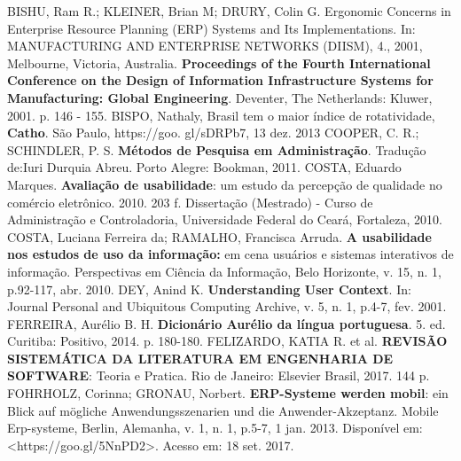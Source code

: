 \newline
\noindent 
BISHU, Ram R.; KLEINER, Brian M; DRURY, Colin G. Ergonomic Concerns in Enterprise Resource Planning (ERP) Systems and Its Implementations. In: MANUFACTURING AND ENTERPRISE NETWORKS (DIISM), 4., 2001, Melbourne, Victoria, Australia. \textbf{Proceedings of the Fourth International Conference on the Design of Information Infrastructure Systems for Manufacturing: Global Engineering}. Deventer, The Netherlands: Kluwer, 2001. p. 146 - 155.
\newline
\newline
\noindent
BISPO, Nathaly, Brasil tem o maior índice de rotatividade, \textbf{Catho}. São Paulo, https://goo. gl/sDRPb7, 13 dez. 2013
\newline
\newline
\noindent
COOPER, C. R.; SCHINDLER, P. S. \textbf{Métodos de Pesquisa em Administração}. Tradução de:Iuri Durquia Abreu. Porto Alegre: Bookman, 2011.
\newline
\newline
\noindent
COSTA, Eduardo Marques. \textbf{Avaliação de usabilidade}: um estudo da percepção de qualidade no comércio eletrônico. 2010. 203 f. Dissertação (Mestrado) - Curso de Administração e Controladoria, Universidade Federal do Ceará, Fortaleza, 2010.
\newline
\newline
\noindent
COSTA, Luciana Ferreira da; RAMALHO, Francisca Arruda. \textbf{A usabilidade nos estudos de uso da informação:} em cena usuários e sistemas interativos de informação. Perspectivas em Ciência da Informação, Belo Horizonte, v. 15, n. 1, p.92-117, abr. 2010.
\newline
\newline
\noindent
DEY, Anind K. \textbf{Understanding User Context}. In: Journal Personal and Ubiquitous Computing Archive, v. 5, n. 1, p.4-7, fev. 2001.
\newline
\newline
\noindent
FERREIRA, Aurélio B. H. \textbf{Dicionário Aurélio da língua portuguesa}. 5. ed. Curitiba: Positivo, 2014. p. 180-180.
\newline
\newline
\noindent
FELIZARDO, KATIA R. et al. \textbf{REVISÃO SISTEMÁTICA DA LITERATURA EM ENGENHARIA DE SOFTWARE}: Teoria e Pratica. Rio de Janeiro: Elsevier Brasil, 2017. 144 p.
\newline
\newline
\noindent
FOHRHOLZ, Corinna; GRONAU, Norbert. \textbf{ERP-Systeme werden mobil}: ein Blick auf mögliche Anwendungsszenarien und die Anwender-Akzeptanz. Mobile Erp-systeme, Berlin, Alemanha, v. 1, n. 1, p.5-7, 1 jan. 2013. Disponível em: <https://goo.gl/5NnPD2>. Acesso em: 18 set. 2017.
